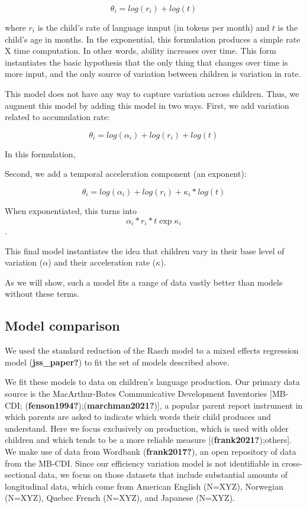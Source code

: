 \documentclass[
]{pnas-new}
\begin{document}
\[\theta_i  = log(r_i) + log(t)\]

\noindent where \(r_i\) is the child's rate of language innput (in
tokens per month) and \(t\) is the child's age in months. In the
exponential, this formulation produces a simple rate X time computation.
In other words, ability increases over time. This form instantiates the
basic hypothesis that the only thing that changes over time is more
input, and the only source of variation between children is variation in
rate.

This model does not have any way to capture variation across children.
Thus, we augment this model by adding this model in two ways. First, we
add variation related to accumulation rate:

\[\theta_i  = log(\alpha_i) + log(r_i) + log(t)\]

In this formulation,

Second, we add a temporal acceleration component (an exponent):

\[\theta_i  = log(\alpha_i) + log(r_i) + \kappa_i * log(t)\]

When exponentiated, this turns into
\[\alpha_i * r_i  * t \exp{\kappa_i}\].

This final model instantiates the idea that children vary in their base
level of variation (\(\alpha\)) and their acceleration rate
(\(\kappa\)).

As we will show, such a model fits a range of data vastly better than
models without these terms.

\subsection{Model comparison}\label{model-comparison}

We used the standard reduction of the Rasch model to a mixed effects
regression model (\textbf{jss\_paper?}) to fit the set of models
described above.

We fit these models to data on children's language production. Our
primary data source is the MacArthur-Bates Communicative Development
Inventories {[}MB-CDI;
(\textbf{fenson1994?});(\textbf{marchman2021?}){]}, a popular parent
report instrument in which parents are asked to indicate which words
their child produces and understand. Here we focus exclusively on
production, which is used with older children and which tends to be a
more reliable measure {[}(\textbf{frank2021?});others{]}. We make use of
data from Wordbank (\textbf{frank2017?}), an open repository of data
from the MB-CDI. Since our efficiency variation model is not
identifiable in cross-sectional data, we focus on those datasets that
include substantial amounts of longitudinal data, which come from
American English (N=XYZ), Norwegian (N=XYZ), Quebec French (N=XYZ), and
Japanese (N=XYZ).
\end{document}
